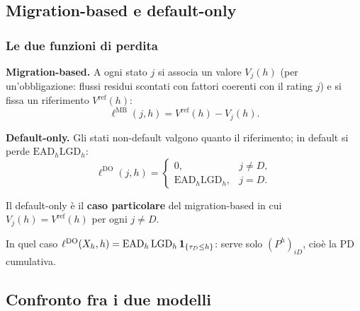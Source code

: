 \subsection{Migration-based e default-only}%

\begin{frame}%
%

\frametitle{Le due funzioni di perdita}%
%

%


\textbf{Migration-based.} A ogni stato $j$ si associa un valore $V_{j}(h)$
(per un'obbligazione: flussi residui scontati con fattori coerenti con il
rating $j$) e si fissa un riferimento $V^{\mathrm{ref}}(h)$:
\[
\ell^{\mathrm{MB}}(j,h) = V^{\mathrm{ref}}(h)-V_{j}(h).
\]

\textbf{Default-only.} Gli stati non-default valgono quanto il riferimento;
in default si perde $\mathrm{EAD}_{h}\mathrm{LGD}_{h}$:
\[
\ell^{\mathrm{DO}}(j,h) =
\begin{cases}
0, & j\neq D,\\
\mathrm{EAD}_{h}\mathrm{LGD}_{h}, & j=D.
\end{cases}
\]

\begin{stepitemize}
\item Il default-only \`e il \textbf{caso particolare} del migration-based in
cui $V_{j}(h)=V^{\mathrm{ref}}(h)$ per ogni $j\neq D$.

\item In quel caso $\ell^{\mathrm{DO}}(X_{h},h)=\mathrm{EAD}_{h}\,
\mathrm{LGD}_{h}\,\mathbf{1}_{\{\tau_{D}\leq h\}}$: serve solo $(P^{h})_{iD}$, cio\`e
la $\mathrm{PD}$ cumulativa.
\end{stepitemize}

\transboxout
\end{frame}%



\subsection{Confronto fra i due modelli}%

